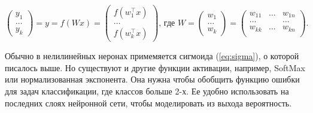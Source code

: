 \begin{equation*}
\begin{pmatrix}
   y_1 \\
   \ldots \\
   y_k
\end{pmatrix} = y = f(Wx) =
\begin{pmatrix}
   f(w_1^\top x)\\
   \ldots \\
   f(w_k^\top x)
\end{pmatrix}\text{, где } W =
\begin{pmatrix}
   w_1 \\
   \ldots \\
   w_k
\end{pmatrix} =
\begin{pmatrix}
   w_{11} & \ldots & w_{1n}\\
   \ldots &  & \ldots\\
   w_{kk} & \ldots & w_{kn}\\
\end{pmatrix}.
\end{equation*}



Обычно в нелилинейных неронах примемяется сигмоида (\ref{eq:sigma}), о которой писалось выше. Но существуют и другие функции активации, например, SoftMax или нормализованная экспонента. Она нужна чтобы обобщить функцию ошибки для задач классификации, где классов больше 2-х. Ее удобно использовать на последних слоях нейронной сети, чтобы моделировать из выхода вероятность.


